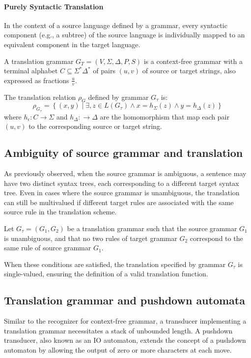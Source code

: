 \paragraph*{Purely Syntactic Translation}
In the context of a source language defined by a grammar, every syntactic component (e.g., a subtree) of the source language is individually mapped to an equivalent component in the target language.
\begin{definition}
    A translation grammar $G_T = \left( V, \Sigma, \Delta, P, S \right)$ is a context-free grammar with a terminal alphabet $C \subseteq \Sigma^{\ast} \Delta^{\ast}$ of pairs $\left( u, v \right)$ of source or target strings, also expressed as fractions $\frac{u}{v}$.
\end{definition}
\begin{definition}
    The translation relation $\rho_G$ defined by grammar $G_\tau$ is:
    \[ \rho_{G_\tau}  = \left\{ \left( x, y \right) \mid  \exists , z \in L\left( G_\tau \right) \land x = h_\Sigma \left( z \right) \land y = h_\Delta \left( z \right) \right\} \]
    where $h_\epsilon : C \rightarrow \Sigma$ and $h_\Delta : \rightarrow \Delta$ are the homomorphism that map each pair $\left( u, v \right)$ to the corresponding source or target string.
\end{definition}

\subsection{Ambiguity of source grammar and translation}
As previously observed, when the source grammar is ambiguous, a sentence may have two distinct syntax trees, each corresponding to a different target syntax tree. 
Even in cases where the source grammar is unambiguous, the translation can still be multivalued if different target rules are associated with the same source rule in the translation scheme.
\begin{property}
    Let $G_\tau = \left( G_1, G_2 \right)$ be a translation grammar such that the source grammar $G_1$ is unambiguous, and that no two rules of target grammar $G_2$ correspond to the same rule of source grammar $G_1$.
\end{property}
When these conditions are satisfied, the translation specified by grammar $G_\tau$ is single-valued, ensuring the definition of a valid translation function.

\subsection{Translation grammar and pushdown automata}
Similar to the recognizer for context-free grammar, a transducer implementing a translation grammar necessitates a stack of unbounded length.
A pushdown transducer, also known as an IO automaton, extends the concept of a pushdown automaton by allowing the output of zero or more characters at each move.

